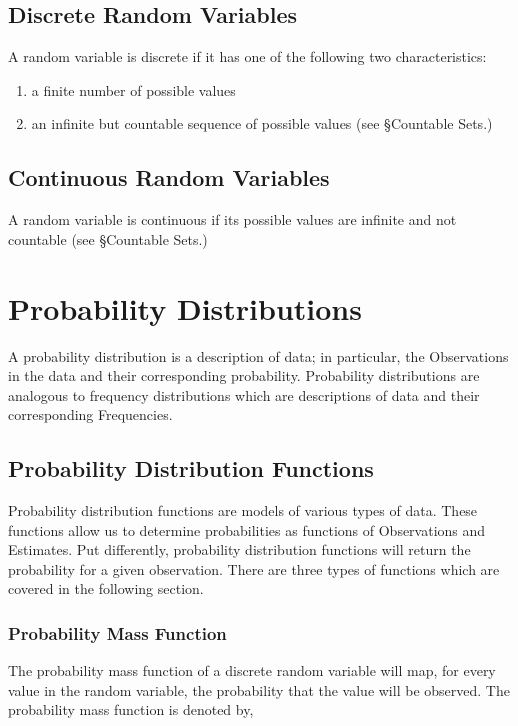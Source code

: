 \documentclass{article}
\begin{document}
\subsection{Discrete Random Variables}
 A random variable is discrete if it has one of the following two characteristics:
 \begin{enumerate}
     \item a finite number of possible values
     \item an infinite but countable sequence of possible values (see §Countable Sets.)
 \end{enumerate}

\subsection{Continuous Random Variables}
A random variable is continuous if its possible values are infinite and not countable (see §Countable Sets.)

\newpage
\section{Probability Distributions}
A probability distribution is a description of data; in particular, the Observations in the data and their corresponding probability. Probability distributions are analogous to frequency distributions which are descriptions of data and their corresponding Frequencies.

\subsection{Probability Distribution Functions}
Probability distribution functions are models of various types of data. These functions allow us to determine probabilities as functions of Observations and Estimates. Put differently, probability distribution functions will return the probability for a given observation. There are three types of functions which are covered in the following section.

\subsubsection{Probability Mass Function}
The probability mass function of a discrete random variable will map, for every value in the random variable, the probability that the value will be observed. The probability mass function is denoted by,
\end{document}
